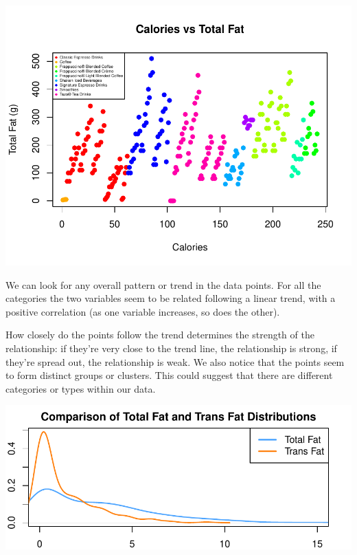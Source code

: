 \documentclass[
]{article}
\begin{document}
\begin{center}\includegraphics{Statistical_Learning_Final_Report_files/figure-latex/fat_comparison-1} \end{center}

We can look for any overall pattern or trend in the data points. For all
the categories the two variables seem to be related following a linear
trend, with a positive correlation (as one variable increases, so does
the other).

How closely do the points follow the trend determines the strength of
the relationship: if they're very close to the trend line, the
relationship is strong, if they're spread out, the relationship is weak.
We also notice that the points seem to form distinct groups or clusters.
This could suggest that there are different categories or types within
our data.

\begin{center}\includegraphics{Statistical_Learning_Final_Report_files/figure-latex/fat_comparison_-1} \end{center}
\end{document}
